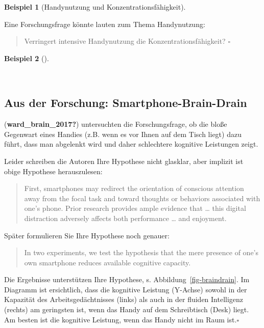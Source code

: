 \documentclass[
  a4paper,
  DIV=11]{scrreprt}
\theoremstyle{definition}
\theoremstyle{definition}
\newtheorem{example}{Beispiel}[chapter]
\theoremstyle{definition}
\theoremstyle{remark}
\begin{document}
\begin{example}[Handynutzung und
Konzentrationsfähigkeit]\protect\hypertarget{exm-braindrain}{}\label{exm-braindrain}

Eine Forschungsfrage könnte lauten zum Thema Handynutzung:

\begin{quote}
Verringert intensive Handynutzung die Konzentrationsfähigkeit?
\(\square\)
\end{quote}

\end{example}

\begin{example}[]\protect\hypertarget{exm-braindrain2}{}\label{exm-braindrain2}

~

\subsection{Aus der Forschung:
Smartphone-Brain-Drain}\label{aus-der-forschung-smartphone-brain-drain-1}

(\textbf{ward\_brain\_2017?}) untersuchten die Forschungsfrage, ob die
bloße Gegenwart eines Handies (z.B. wenn es vor Ihnen auf dem Tisch
liegt) dazu führt, dass man abgelenkt wird und daher schlechtere
kognitive Leistungen zeigt.

Leider schreiben die Autoren Ihre Hypothese nicht glasklar, aber
implizit ist obige Hypothese herauszulesen:

\begin{quote}
First, smartphones may redirect the orientation of conscious attention
away from the focal task and toward thoughts or behaviors associated
with one's phone. Prior research provides ample evidence that \ldots{}
this digital distraction adversely affects both performance \ldots{} and
enjoyment.
\end{quote}

Später formulieren Sie Ihre Hypothese noch genauer:

\begin{quote}
In two experiments, we test the hypothesis that the mere presence of
one's own smartphone reduces available cognitive capacity.
\end{quote}

Die Ergebnisse unterstützen Ihre Hypothese, s.
Abbildung~\ref{fig-braindrain}. Im Diagramm ist ersichtlich, dass die
kognitive Leistung (Y-Achse) sowohl in der Kapazität des
Arbeitsgedächtnisses (links) als auch in der fluiden Intelligenz
(rechts) am geringsten ist, wenn das Handy auf dem Schreibtisch (Desk)
liegt. Am besten ist die kognitive Leistung, wenn das Handy nicht im
Raum ist.\(\square\)


\end{example}
\end{document}
